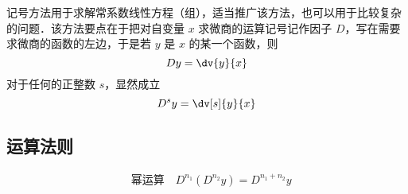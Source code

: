 
\begin{issues}
\issueDraft
\end{issues}

记号方法用于求解常系数线性方程（组），适当推广该方法，也可以用于比较复杂的问题．该方法要点在于把对自变量 $x$ 求微商的运算记号记作因子 $D$，写在需要求微商的函数的左边，于是若 $y$ 是 $x$ 的某一个函数，则
\begin{equation}
Dy=\dv{y}{x}
\end{equation}
对于任何的正整数 $s$，显然成立
\begin{equation}
D^sy=\dv[s]{y}{x}
\end{equation}
\subsection{运算法则}
\begin{equation}
\begin{aligned}
&\text{幂运算}\quad D^{n_1}(D^{n_2}y)=D^{n_1+n_2}y\\
&\text{}
\end{aligned}
\end{equation}